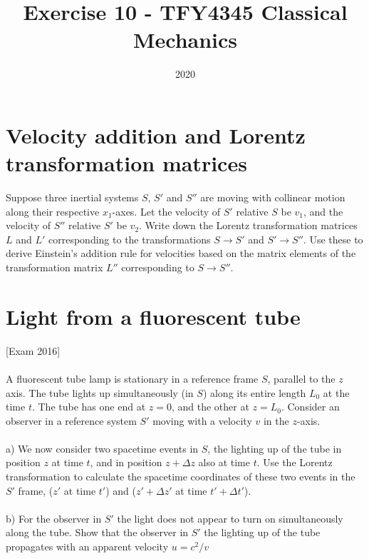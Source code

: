 \documentclass{article}
\title{Exercise 10 - TFY4345 Classical Mechanics}
\date{2020}
\begin{document}
    \maketitle
    \section{Velocity addition and Lorentz transformation matrices}
    Suppose three inertial systems $S, \, S'$ and $S''$ are moving with collinear motion along their respective $x_1$-axes. Let the velocity of $S'$ relative $S$ be $v_1$, and the velocity of $S''$ relative $S'$ be $v_2$. Write down the Lorentz transformation matrices $L$ and $L'$ corresponding to the transformations $S \rightarrow S'$ and $S' \rightarrow S''$. Use these to derive Einstein's addition rule for velocities based on the matrix elements of the transformation matrix $L''$ corresponding to $S \rightarrow S''$. \newline {} 
    \section{Light from a fluorescent tube}
        [Exam 2016] \\ \\
        A fluorescent tube lamp is stationary in a reference frame $S$, parallel to the $z$ axis. The tube lights up simultaneously (in $S$) along its entire length $L_0$ at the time $t$. The tube has one end at $z=0$, and the other at $z = L_0$. Consider an observer in a reference system $S'$ moving with a velocity $v$ in the $z$-axis. \\ \\
        a) We now consider two spacetime events in $S$, the lighting up of the tube in position $z$ at time $t$, and in position $z + \Delta z$ also at time $t$. Use the Lorentz transformation to calculate the spacetime coordinates of these two events in the $S'$ frame, ($z'$ at time $t'$) and ($z' + \Delta z'$ at time $t' + \Delta t'$). \\ \\
        b) For the observer in $S'$ the light does not appear to turn on simultaneously along the tube. Show that the observer in $S'$ the lighting up of the tube propagates with an apparent velocity $u = c^2/v$
\end{document}
